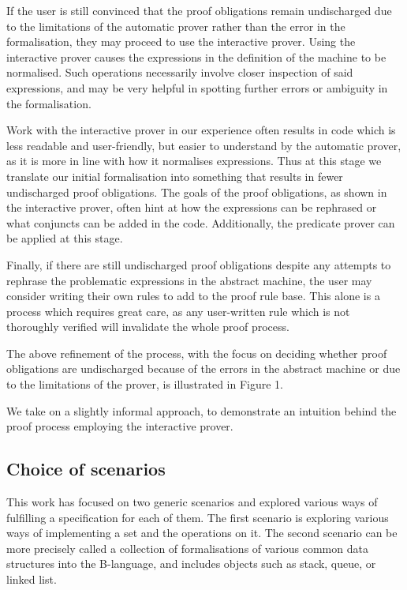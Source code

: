 \documentclass[12pt,journal,duplex]{IEEEtran}
\begin{document}
	If the user is still convinced that the proof obligations remain undischarged due to the limitations of the automatic prover rather than the error in the formalisation, they may proceed to use the interactive prover. Using the interactive prover causes the expressions in the definition of the machine to be normalised. Such operations necessarily involve closer inspection of said expressions, and may be very helpful in spotting further errors or ambiguity in the formalisation.

	Work with the interactive prover in our experience often results in code which is less readable and user-friendly, but easier to understand by the automatic prover, as it is more in line with how it normalises expressions. Thus at this stage we translate our initial formalisation into something that results in fewer undischarged proof obligations. The goals of the proof obligations, as shown in the interactive prover, often hint at how the expressions can be rephrased or what conjuncts can be added in the code. Additionally, the predicate prover can be applied at this stage.

	Finally, if there are still undischarged proof obligations despite any attempts to rephrase the problematic expressions in the abstract machine, the user may consider writing their own rules to add to the proof rule base. This alone is a process which requires great care, as any user-written rule which is not thoroughly verified will invalidate the whole proof process.

	The above refinement of the process, with the focus on deciding whether proof obligations are undischarged because of the errors in the abstract machine or due to the limitations of the prover, is illustrated in Figure 1.

	We take on a slightly informal approach, to demonstrate an intuition behind the proof process employing the interactive prover.

	\subsection{Choice of scenarios}
	This work has focused on two generic scenarios and explored various ways of fulfilling a specification for each of them. The first scenario is exploring various ways of implementing a set and the operations on it. The second scenario can be more precisely called a collection of formalisations of various common data structures into the B-language, and includes objects such as stack, queue, or linked list.
\end{document}
